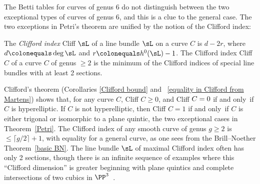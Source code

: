 The Betti tables for curves of genus 6
do not distinguish between the two exceptional types of 
curves of genus 6, and this is a clue to the general case.
The two exceptions in Petri's theorem are unified  by  the 
notion of the
%
Clifford index:

\begin{definition}
The \emph{Clifford index} Cliff $\sL$ of a line bundle $\sL$ on a curve
%
$C$ is $d-2r$, where $d \colonequals  \deg \sL$ and $r \colonequals
h^0(\sL)-1$. The Clifford index Cliff $C$ of
a curve $C$ of genus $\geq 2$ is the minimum of the Clifford indices
of special line bundles with at least 2 sections.
\unif
\end{definition}

Clifford's theorem (Corollaries \ref{Clifford bound} and ~\ref{equality
in Clifford from Martens}) shows that, for any curve $C$,
 Cliff $C \geq 0$, and Cliff $C =
\index{Clifford's theorem}%
0$ if and only~if $C$ is hyperelliptic. If $C$ is not hyperelliptic, then
 Cliff $C=1$ if and only~if $C$ is either trigonal or
isomorphic to a plane quintic, the two exceptional cases in Theorem~\ref{Petri}.
 The Clifford index of any smooth curve of
genus $g\geq 2$ is $\leq \lceil g/2\rceil+1$, with equality for a general
curve, as one sees from the Brill--Noether Theorem~\ref{basic BN}. The line bundle $\sL$ of maximal Clifford index often has only
2 sections, though there is an infinite sequence of examples where this
``Clifford dimension'' is greater beginning with plane quintics
and complete intersections of two cubics in $\PP^{3}$~\cite{MR1030141}.

